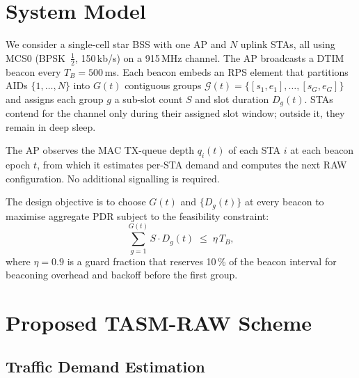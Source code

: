 \documentclass[conference]{IEEEtran}
\begin{document}
\section{System Model}
\label{sec:model}

We consider a single-cell star BSS with one AP and $N$ uplink STAs,
all using MCS0 (BPSK~$\frac{1}{2}$, 150\,kb/s) on a 915\,MHz channel.
The AP broadcasts a DTIM beacon every $T_B\!=\!500$\,ms.
Each beacon embeds an RPS element that partitions AIDs
$\{1,\ldots,N\}$ into $G(t)$ contiguous groups
$\mathcal{G}(t)\!=\!\{[s_1,e_1],\ldots,[s_G,e_G]\}$
and assigns each group $g$ a sub-slot count $S$ and slot duration $D_g(t)$.
STAs contend for the channel only during their assigned slot window;
outside it, they remain in deep sleep.

The AP observes the MAC TX-queue depth $q_i(t)$ of each STA $i$ at
each beacon epoch $t$, from which it estimates per-STA demand and
computes the next RAW configuration.
No additional signalling is required.

The design objective is to choose $G(t)$ and $\{D_g(t)\}$ at every
beacon to maximise aggregate PDR subject to the feasibility constraint:
\begin{equation}
  \sum_{g=1}^{G(t)} S \cdot D_g(t) \;\leq\; \eta\,T_B,
  \label{eq:feasibility}
\end{equation}
where $\eta\!=\!0.9$ is a guard fraction that reserves 10\,\% of the
beacon interval for beaconing overhead and backoff before the first group.

\section{Proposed TASM-RAW Scheme}
\label{sec:design}

\subsection{Traffic Demand Estimation}
\label{sec:demand}
\end{document}
